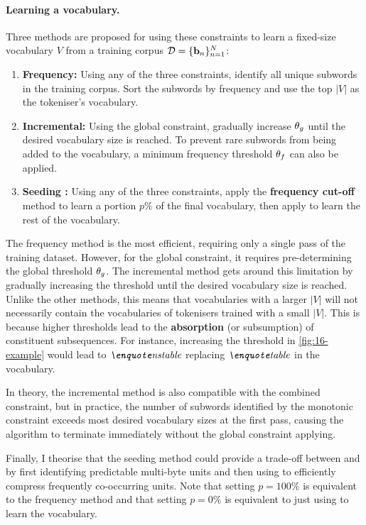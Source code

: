 \paragraph{Learning a vocabulary.} Three methods are proposed for using these constraints to learn a fixed-size vocabulary \(V\) from a training corpus $\mathcal{D} = \{\mathbf{b}_n\}_{n=1}^N$:
\begin{enumerate}
    \item \textbf{Frequency:} Using any of the three constraints, identify all unique subwords in the training corpus. Sort the subwords by frequency and use the top \(|V|\) as the tokeniser's vocabulary.
    \item \textbf{Incremental:} Using the global constraint, gradually increase $\theta_g$ until the desired vocabulary size is reached. To prevent rare subwords from being added to the vocabulary, a minimum frequency threshold $\theta_f$ can also be applied.
    \item \textbf{Seeding \bpe:} Using any of the three constraints, apply the \textbf{frequency cut-off} method to learn a portion $p\%$ of the final vocabulary, then apply \bpe to learn the rest of the vocabulary. 
\end{enumerate}

The frequency method is the most efficient, requiring only a single pass of the training dataset. However, for the global constraint, it requires pre-determining the global threshold $\theta_g$. The incremental method gets around this limitation by gradually increasing the threshold until the desired vocabulary size is reached. Unlike the other methods, this means that vocabularies with a larger \(|V|\) will not necessarily contain the vocabularies of tokenisers trained with a small \(|V|\). This is because higher thresholds lead to the \textbf{absorption} (or subsumption) of constituent subsequences. For instance, increasing the threshold in \cref{fig:16-example} would lead to $\ex{nstable}$ replacing $\ex{table}$ in the vocabulary.

In theory, the incremental method is also compatible with the combined constraint, but in practice, the number of subwords identified by the monotonic constraint exceeds most desired vocabulary sizes at the first pass, causing the algorithm to terminate immediately without the global constraint applying.

Finally, I theorise that the seeding method could provide a trade-off between \tokname and \bpe by first identifying predictable multi-byte units and then using \bpe to efficiently compress frequently co-occurring units. Note that setting $p=100\%$ is equivalent to the frequency method and that setting  $p=0\%$ is equivalent to just using \bpe to learn the vocabulary.

